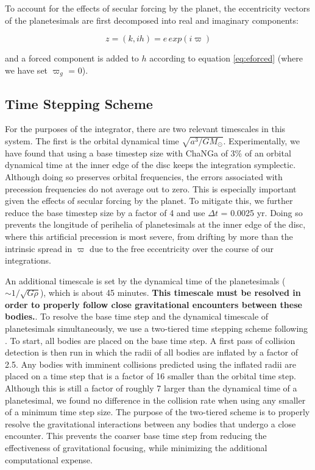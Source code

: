\documentclass[fleqn,usenatbib]{mnras}
\begin{document}
To account for the effects of secular forcing by the planet, the eccentricity vectors of the planetesimals are first decomposed into real and imaginary 
components:

\begin{equation}\label{eq:kh}
	z = (k, ih) = e \, exp(i \varpi)
\end{equation}

\noindent and a forced component is added to $h$ according to equation \ref{eq:eforced} (where we have set $\varpi_{g}$ = 0).

\subsection{Time Stepping Scheme}\label{sec:timestep}

For the purposes of the integrator, there are two relevant timescales in this system. The first is the orbital dynamical time $\sqrt{a^3/
G M_{\odot}}$. Experimentally, we have found that using a base timestep size with {\sc ChaNGa} of 3\% of an orbital dynamical time
at the inner edge of the disc keeps the integration symplectic. Although doing so preserves orbital frequencies, the errors associated with
precession frequencies do not average out to zero. This is especially important given the effects of secular forcing by the planet. To mitigate
this, we further reduce the base timestep size by a factor of 4 and use $\Delta t$ = 0.0025 yr. Doing so prevents the longitude of perihelia of
planetesimals at the inner edge of the disc, where this artificial precession is most severe, from drifting by more than the intrinsic spread in $\varpi$ due to the
free eccentricity over the course of our integrations.

An additional timescale is set by the dynamical time of the planetesimals ($\sim 1/\sqrt{G \rho}$), which is about 45 minutes. \textbf{This timescale must be resolved in order to properly follow close gravitational encounters between these bodies.}. To 
resolve the base time step and the dynamical timescale of planetesimals simultaneously, we use a two-tiered time stepping scheme following
\citep{2015ApJ...806...23L}. 
To start, all bodies are placed on the base time step. A first pass of collision detection is then run in 
which the radii of all bodies are inflated by a factor of 2.5. Any bodies with imminent collisions predicted using the inflated radii are 
placed on a time step that is a factor of 16 smaller than the orbital
time step. Although this is still a factor of roughly 7 larger than the dynamical time of a planetesimal, we found no difference in the collision rate
when using any smaller of a minimum time step size.
The purpose of the two-tiered scheme is to properly resolve 
the gravitational interactions between any bodies that undergo a close encounter. This prevents the coarser base time step from 
reducing the effectiveness of gravitational focusing, while minimizing the additional computational expense.
\end{document}
